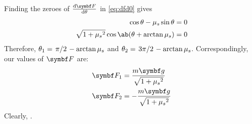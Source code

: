 Finding the zeroes of \(\odv{\mv{F}}{\theta}\) in \cref{eq:dfd0} gives
\begin{align*}
  \cos\theta-\mu_s\sin\theta &= 0 \\
  \sqrt{1+{\mu_s}^2}\cos\ab(\theta+\arctan\mu_s) &= 0
\end{align*}
Therefore, \(\theta_1 = \lf{\pi}{2}-\arctan\mu_s\) and \(\theta_2 =
\lf{3\pi}{2}-\arctan\mu_s\).
Correspondingly, our values of \(\mv{F}\) are:
\begin{align*}
  \mv{F}_1 &= \f{m\mv{g}}{\sqrt{1+{\mu_s}^2}} \\
  \mv{F}_2 &= -\f{m\mv{g}}{\sqrt{1+{\mu_s}^2}}
\end{align*}
Clearly, .

